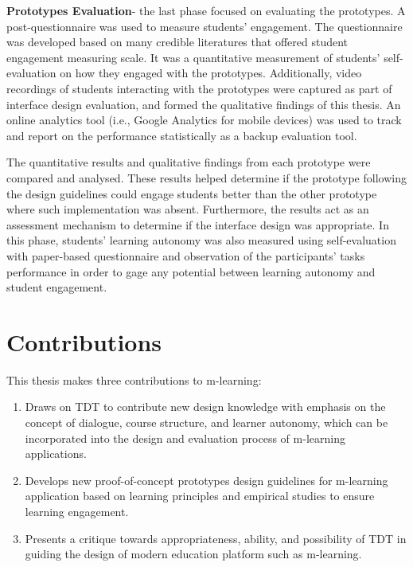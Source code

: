 \textbf{Prototypes Evaluation}- the last phase focused on evaluating the prototypes. A post-questionnaire was used to measure students' engagement. The questionnaire was developed based on many credible literatures that offered student engagement measuring scale. It was a quantitative measurement of students' self-evaluation on how they engaged with the prototypes. Additionally, video recordings of students interacting with the prototypes were captured as part of interface design evaluation, and formed the qualitative findings of this thesis. An online analytics tool (i.e., Google Analytics for mobile devices) was used to track and report on the performance statistically as a backup evaluation tool. 

The quantitative results and qualitative findings from each prototype were compared and analysed. These results helped determine if the prototype following the design guidelines could engage students better than the other prototype where such implementation was absent. Furthermore, the results act as an assessment mechanism to determine if the interface design was appropriate. In this phase, students' learning autonomy was also measured using self-evaluation with paper-based questionnaire and observation of the participants' tasks performance in order to gage any potential between learning autonomy and student engagement. 

\section{Contributions}
This thesis makes three contributions to m-learning: 

\begin{enumerate}

\item Draws on TDT to contribute new design knowledge with emphasis on the concept of dialogue, course structure, and learner autonomy, which can be incorporated into the design and evaluation process of m-learning applications. 

\item Develops new proof-of-concept prototypes design guidelines for m-learning application based on learning principles and empirical studies to ensure learning engagement. 

\item Presents a critique towards appropriateness, ability, and possibility of TDT in guiding the design of modern education platform such as m-learning. 

\end{enumerate}

